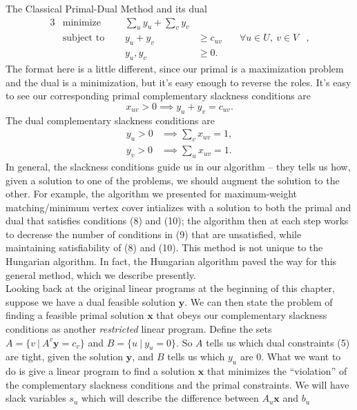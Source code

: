 \documentclass[11pt]{article}
\renewcommand{\'}{^{'}}
\begin{document}
\begin{section}{The Classical Primal-Dual Method}
	and its dual
	\begin{alignat}{3}
		& \text{minimize } & \sum_u y_u + \sum_v y_v& \\
		& \text{subject to } \quad & y_u + y_v & \geq c_{uv} & \quad \forall 
					u\in U,\ v\in V &, \\
				    && y_u,y_v & \geq 0.
	\end{alignat}
	The format here is a little different, since our primal is a maximization problem and the dual 
	is a minimization, but it's easy enough to reverse the roles. It's easy to see our 
	corresponding primal complementary slackness conditions are
	\begin{equation}
		x_{uv} > 0 \implies y_u + y_v = c_{uv}.
	\end{equation}
	The dual complementary slackness conditions are
	\begin{align}
		y_u > 0 &\implies \sum_v x_{uv} = 1,\\
		y_v > 0 &\implies \sum_u x_{uv} = 1.
	\end{align}
	In general, the slackness conditions guide us in our algorithm -- they tells us how, given a 
	solution to one of the problems, we should augment the solution to the other. For example, the 
	algorithm we presented for maximum-weight matching/minimum vertex cover intializes with 
	a solution to both the primal and dual that satisfies conditions (8) and (10); the algorithm 
	then at each step works to decrease the number of conditions in (9) that are unsatisfied, while 
	maintaining satisfiability of (8) and (10). This method is not unique to the Hungarian 
	algorithm. In fact, the Hungarian algorithm paved the way for this general method, which we 
	describe presently.\\
	Looking back at the original linear programs at the beginning of this chapter, suppose we have 
	a dual feasible solution $\mathbf{y}$. We can then state the problem of finding a feasible 
	primal solution $\mathbf{x}$ that obeys our complementary slackness conditions as another 
	\emph{restricted} linear program. Define the sets $A = \{v\ |\ A^{v}\mathbf{y} = c_v\}$ and 
	$B = \{u\ |\ y_u = 0\}$. So $A$ tells us which dual constraints (5) are tight, 
	given the solution $\mathbf{y}$, and $B$ tells us which $y_u$ are 0. What we want to do is 
	give a linear program to find a solution $\mathbf{x}$ that minimizes the 
	``violation'' of the complementary slackness conditions and the primal constraints. We will 
	have slack variables $s_u$ which will describe the difference between $A_u\mathbf{x}$ and $b_u$ 

\end{section}
\end{document}
